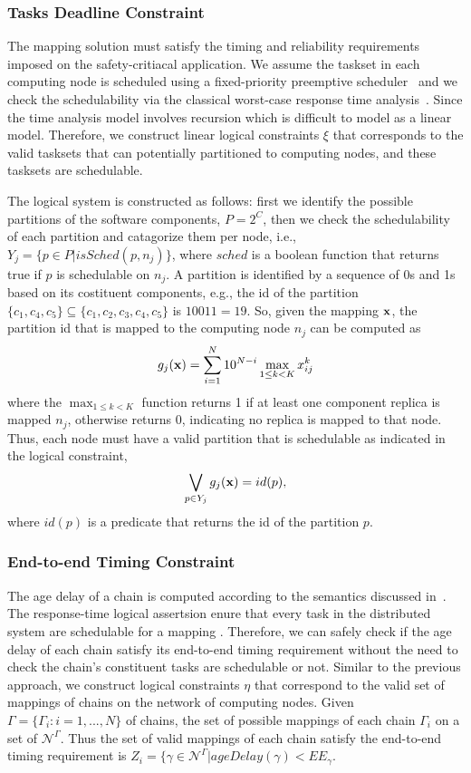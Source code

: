 \subsubsection{Tasks Deadline Constraint}
The mapping solution must satisfy the timing and reliability requirements imposed on the safety-critiacal application. We assume the taskset in each computing node is scheduled using a fixed-priority preemptive scheduler~\cite{Sha2004RealPerspective} and we check the schedulability via the classical worst-case response time analysis~\cite{Baruah2011Response-timeSystems}. Since the time analysis model involves recursion which is difficult to model as a linear model. Therefore, we construct linear logical constraints $\xi$ that corresponds to the valid tasksets that can potentially partitioned to computing nodes, and these tasksets are schedulable.

The logical system is constructed as follows: first we identify the possible partitions of the software components, $P=2^C$, then we check the schedulability of each partition and catagorize them per node, i.e., $Y_j=\{p\in P| isSched(p,n_j)\}$, where $sched$ is a boolean function that returns true if $p$ is schedulable on $n_j$.  A partition is identified by a sequence of 0s and 1s based on its costituent components, e.g., the id of the partition $\{c_1,c_4,c_5\}\subseteq \{c_1,c_2,c_3,c_4,c_5\}$ is $10011=19$. So, given the mapping $\textbf{x}$, the partition id that is mapped to the computing node $n_j$ can be computed as
\begin{align}
	g_j(\textbf{x})=\sum_{i=1}^{N}{10^{N-i}\max_{1\leq k< K}x^{k}_{ij}}
\end{align}
where the $\max_{1\leq k< K}$ function returns 1 if at least one component replica is mapped $n_j$, otherwise returns 0, indicating no replica is mapped to that node. Thus, each node must have a valid partition that is schedulable as indicated in the logical constraint,
\begin{align}
\bigvee\limits_{p\in Y_j}g_j (\textbf{x})= id(p) ,
\end{align}
where $id(p)$ is a predicate that returns the id of the partition $p$.

\subsubsection{End-to-end Timing Constraint}
The age delay of a chain is computed according to the semantics discussed in~\cite{Feiertag2009ASemantics}\cite{mubeen2013support}. The response-time logical assertsion enure that every task in the distributed system are schedulable for a mapping \ttx. Therefore, we can safely check if the age delay of each chain satisfy its end-to-end timing requirement without the need to check the chain's constituent tasks are schedulable or not. Similar to the previous approach, we construct logical constraints $\eta$ that correspond to the valid set of mappings of chains on the network of computing nodes.  Given $\Gamma =\{\Gamma_i:i=1,...,N\}$ of chains, the set of possible mappings of each chain $\Gamma_i$ on a set of $\mathcal{N}^\Gamma$. Thus the set of valid mappings of each chain satisfy the end-to-end timing requirement is $Z_i=\{\gamma\in \mathcal{N}^\Gamma| ageDelay(\gamma) < EE_\gamma$.

